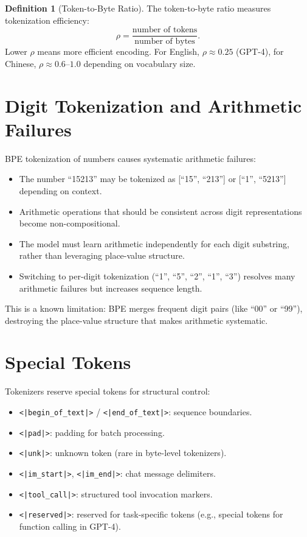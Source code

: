 \documentclass[11pt,a4paper]{book}
\theoremstyle{definition}
\newtheorem{definition}{Definition}[chapter]
\begin{document}
\begin{definition}[Token-to-Byte Ratio]
	The token-to-byte ratio measures tokenization efficiency:
	\begin{equation}
		\rho = \frac{\text{number of tokens}}{\text{number of bytes}}.
	\end{equation}
	Lower $\rho$ means more efficient encoding. For English, $\rho \approx 0.25$ (GPT-4), for Chinese, $\rho \approx 0.6$--$1.0$ depending on vocabulary size.
\end{definition}

\section{Digit Tokenization and Arithmetic Failures}

BPE tokenization of numbers causes systematic arithmetic failures:

\begin{itemize}
	\item The number ``15213'' may be tokenized as [``15'', ``213''] or [``1'', ``5213''] depending on context.
	\item Arithmetic operations that should be consistent across digit representations become non-compositional.
	\item The model must learn arithmetic independently for each digit substring, rather than leveraging place-value structure.
	\item Switching to per-digit tokenization (``1'', ``5'', ``2'', ``1'', ``3'') resolves many arithmetic failures but increases sequence length.
\end{itemize}

This is a known limitation: BPE merges frequent digit pairs (like ``00'' or ``99''), destroying the place-value structure that makes arithmetic systematic.

\section{Special Tokens}

Tokenizers reserve special tokens for structural control:

\begin{itemize}
	\item \texttt{<|begin\_of\_text|>} / \texttt{<|end\_of\_text|>}: sequence boundaries.
	\item \texttt{<|pad|>}: padding for batch processing.
	\item \texttt{<|unk|>}: unknown token (rare in byte-level tokenizers).
	\item \texttt{<|im\_start|>}, \texttt{<|im\_end|>}: chat message delimiters.
	\item \texttt{<|tool\_call|>}: structured tool invocation markers.
	\item \texttt{<|reserved|>}: reserved for task-specific tokens (e.g., special tokens for function calling in GPT-4).
\end{itemize}
\end{document}
